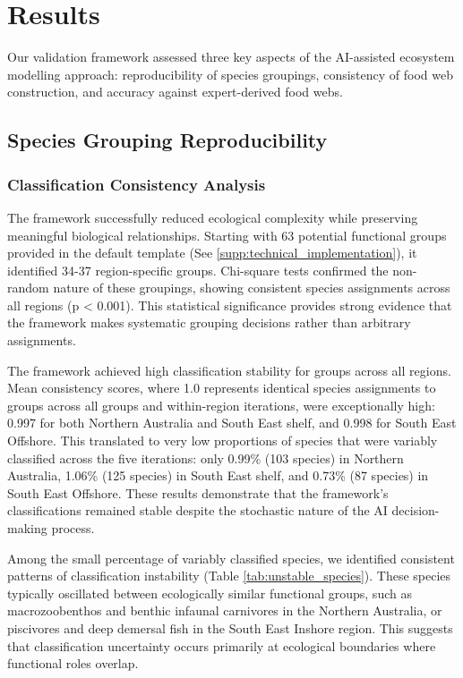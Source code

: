 \section{Results}

Our validation framework assessed three key aspects of the AI-assisted ecosystem modelling approach: reproducibility of species groupings, consistency of food web construction, and accuracy against expert-derived food webs.

\subsection{Species Grouping Reproducibility}

\subsubsection{Classification Consistency Analysis}
The framework successfully reduced ecological complexity while preserving meaningful biological relationships. Starting with 63 potential functional groups provided in the default template (See \ref{supp:technical_implementation}), it identified 34-37 region-specific groups. Chi-square tests confirmed the non-random nature of these groupings, showing consistent species assignments across all regions (p < 0.001). This statistical significance provides strong evidence that the framework makes systematic grouping decisions rather than arbitrary assignments.

The framework achieved high classification stability for groups across all regions. Mean consistency scores, where 1.0 represents identical species assignments to groups across all groups and within-region iterations, were exceptionally high: 0.997 for both Northern Australia and South East shelf, and 0.998 for South East Offshore. This translated to very low proportions of species that were variably classified across the five iterations: only 0.99\% (103 species) in Northern Australia, 1.06\% (125 species) in South East shelf, and 0.73\% (87 species) in South East Offshore. These results demonstrate that the framework's classifications remained stable despite the stochastic nature of the AI decision-making process.

Among the small percentage of variably classified species, we identified consistent patterns of classification instability (Table \ref{tab:unstable_species}). These species typically oscillated between ecologically similar functional groups, such as macrozoobenthos and benthic infaunal carnivores in the Northern Australia, or piscivores and deep demersal fish in the South East Inshore region. This suggests that classification uncertainty occurs primarily at ecological boundaries where functional roles overlap.

